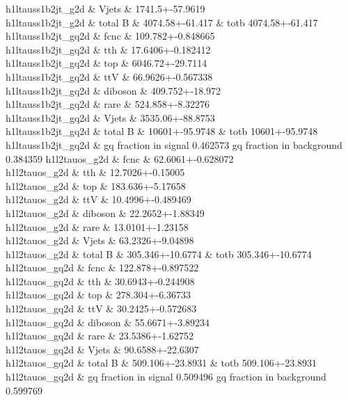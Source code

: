 h1ltauss1b2jt_g2d \& Vjets \& 1741.5+-57.9619 \\
h1ltauss1b2jt_g2d \&  total B  \& 4074.58+-61.417 \&  totb 4074.58+-61.417 \\
h1ltauss1b2jt_gq2d \& fcnc \& 109.782+-0.848665 \\
h1ltauss1b2jt_gq2d \& tth \& 17.6406+-0.182412 \\
h1ltauss1b2jt_gq2d \& top \& 6046.72+-29.7114 \\
h1ltauss1b2jt_gq2d \& ttV \& 66.9626+-0.567338 \\
h1ltauss1b2jt_gq2d \& diboson \& 409.752+-18.972 \\
h1ltauss1b2jt_gq2d \& rare \& 524.858+-8.32276 \\
h1ltauss1b2jt_gq2d \& Vjets \& 3535.06+-88.8753 \\
h1ltauss1b2jt_gq2d \&  total B  \& 10601+-95.9748 \&  totb 10601+-95.9748 \\
h1ltauss1b2jt_gq2d \&  gq fraction in signal 0.462573 gq fraction in background 0.384359
h1l2tauos_g2d \& fcnc \& 62.6061+-0.628072 \\
h1l2tauos_g2d \& tth \& 12.7026+-0.15005 \\
h1l2tauos_g2d \& top \& 183.636+-5.17658 \\
h1l2tauos_g2d \& ttV \& 10.4996+-0.489469 \\
h1l2tauos_g2d \& diboson \& 22.2652+-1.88349 \\
h1l2tauos_g2d \& rare \& 13.0101+-1.23158 \\
h1l2tauos_g2d \& Vjets \& 63.2326+-9.04898 \\
h1l2tauos_g2d \&  total B  \& 305.346+-10.6774 \&  totb 305.346+-10.6774 \\
h1l2tauos_gq2d \& fcnc \& 122.878+-0.897522 \\
h1l2tauos_gq2d \& tth \& 30.6943+-0.244908 \\
h1l2tauos_gq2d \& top \& 278.304+-6.36733 \\
h1l2tauos_gq2d \& ttV \& 30.2425+-0.572683 \\
h1l2tauos_gq2d \& diboson \& 55.6671+-3.89234 \\
h1l2tauos_gq2d \& rare \& 23.5386+-1.62752 \\
h1l2tauos_gq2d \& Vjets \& 90.6588+-22.6307 \\
h1l2tauos_gq2d \&  total B  \& 509.106+-23.8931 \&  totb 509.106+-23.8931 \\
h1l2tauos_gq2d \&  gq fraction in signal 0.509496 gq fraction in background 0.599769